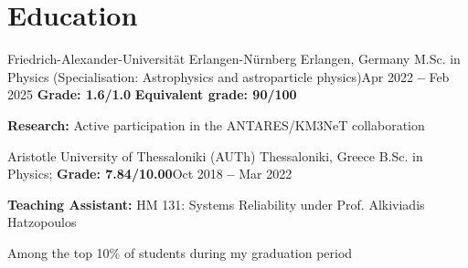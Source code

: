\section{Education}
  \vspace{1.25pt}
  \resumeSubHeadingListStart
    
    \resumeEducationHeading
      {Friedrich-Alexander-Universität Erlangen-Nürnberg
      }{Erlangen, Germany}
      {M.Sc. in Physics (Specialisation: Astrophysics and astroparticle physics)}{Apr 2022 \textbf{--} Feb 2025}
      {\textbf{Grade: 1.6/1.0} \quad \textbf{Equivalent grade: 90/100}}{}
        \resumeSubHeadingListStart
        \small{\item{
             \textbf{Research:} Active participation in the ANTARES/KM3NeT collaboration}}
        \resumeSubHeadingListEnd

    \resumeSubheading
    {Aristotle University of Thessaloniki (AUTh)
      }{Thessaloniki, Greece}
      {B.Sc. in Physics;
      \textbf{Grade: 7.84/10.00}}{Oct 2018 \textbf{--} Mar 2022}
        \resumeSubHeadingListStart
        \small{\item{
             \textbf{Teaching Assistant:} HM 131: Systems Reliability under Prof. Alkiviadis Hatzopoulos}}
        \small{\item{
            Among the top 10\% of students during my graduation period}}  
        \resumeSubHeadingListEnd
  \resumeSubHeadingListEnd